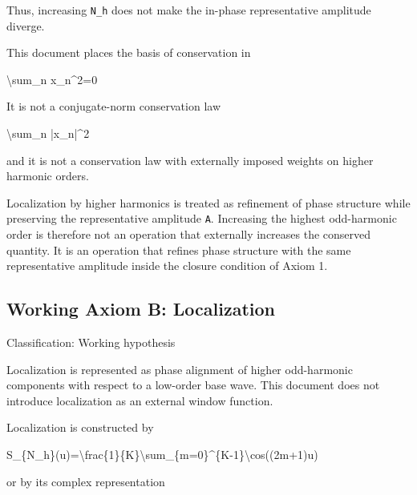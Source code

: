 \documentclass[
  a4paper]{article}
\newenvironment{Shaded}{}{}
\newcommand{\NormalTok}[1]{#1}
\begin{document}
Thus, increasing \texttt{N\_h} does not make the in-phase representative
amplitude diverge.

This document places the basis of conservation in

\begin{Shaded}
\begin{Highlighting}[]
\NormalTok{\textbackslash{}sum\_n x\_n\^{}2=0}
\end{Highlighting}
\end{Shaded}

It is not a conjugate-norm conservation law

\begin{Shaded}
\begin{Highlighting}[]
\NormalTok{\textbackslash{}sum\_n |x\_n|\^{}2}
\end{Highlighting}
\end{Shaded}

and it is not a conservation law with externally imposed weights on
higher harmonic orders.

Localization by higher harmonics is treated as refinement of phase
structure while preserving the representative amplitude \texttt{A}.
Increasing the highest odd-harmonic order is therefore not an operation
that externally increases the conserved quantity. It is an operation
that refines phase structure with the same representative amplitude
inside the closure condition of Axiom 1.

\subsection{Working Axiom B:
Localization}\label{working-axiom-b-localization}

Classification: Working hypothesis

Localization is represented as phase alignment of higher odd-harmonic
components with respect to a low-order base wave. This document does not
introduce localization as an external window function.

Localization is constructed by

\begin{Shaded}
\begin{Highlighting}[]
\NormalTok{S\_\{N\_h\}(u)=\textbackslash{}frac\{1\}\{K\}\textbackslash{}sum\_\{m=0\}\^{}\{K{-}1\}\textbackslash{}cos((2m+1)u)}
\end{Highlighting}
\end{Shaded}

or by its complex representation
\end{document}
